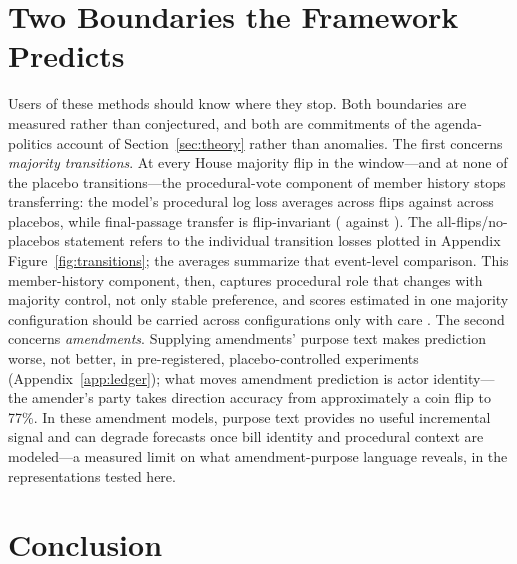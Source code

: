 \documentclass[12pt]{article}
\begin{document}
\section{Two Boundaries the Framework Predicts}
\label{sec:limits}

Users of these methods should know where they stop. Both boundaries
are measured rather than conjectured, and both are commitments of the
agenda-politics account of Section~\ref{sec:theory} rather than
anomalies. The first concerns
\emph{majority transitions}. At every House majority flip in the
window---and at none of the placebo transitions---the
procedural-vote component of member history stops transferring: the
model's procedural log loss averages \flipProcLL{} across flips
against \placeboProcLL{} across placebos, while final-passage
transfer is flip-invariant (\flipPassLL{} against \placeboPassLL).
The all-flips/no-placebos statement refers to the individual
transition losses plotted in Appendix Figure~\ref{fig:transitions};
the averages summarize that event-level comparison. This
member-history component, then, captures procedural role that changes
with majority control, not only stable preference, and scores
estimated in one majority configuration should be carried across
configurations only with care \citep{bateman2017house}. The second
concerns \emph{amendments}. Supplying amendments' purpose text makes
prediction worse, not better, in pre-registered, placebo-controlled
experiments (Appendix~\ref{app:ledger}); what moves amendment
prediction is actor identity---the amender's party takes direction
accuracy from approximately a coin flip to 77\%. In these amendment
models, purpose text provides no useful incremental signal and can
degrade forecasts once bill identity and procedural context are
modeled---a measured limit on what amendment-purpose language
reveals, in the representations tested here.

\section{Conclusion}
\end{document}
